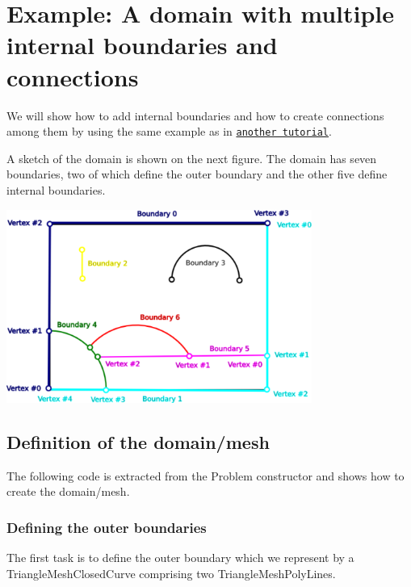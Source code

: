  

\hypertarget{index_example_poisson}{}\section{Example\+: A domain with multiple internal boundaries and connections}\label{index_example_poisson}
We will show how to add internal boundaries and how to create connections among them by using the same example as in \href{../../../../doc/meshes/mesh_from_triangle/html/index.html}{\tt another tutorial}.





A sketch of the domain is shown on the next figure. The domain has seven boundaries, two of which define the outer boundary and the other five define internal boundaries.

 
\begin{DoxyImage}
\includegraphics[width=0.75\textwidth]{sketch_domain}
\end{DoxyImage}




\hypertarget{index_def_domain}{}\subsection{Definition of the domain/mesh}\label{index_def_domain}
The following code is extracted from the Problem constructor and shows how to create the domain/mesh.\hypertarget{index_def_out}{}\subsubsection{Defining the outer boundaries}\label{index_def_out}
The first task is to define the outer boundary which we represent by a {\ttfamily Triangle\+Mesh\+Closed\+Curve} comprising two {\ttfamily Triangle\+Mesh\+Poly\+Lines}.

